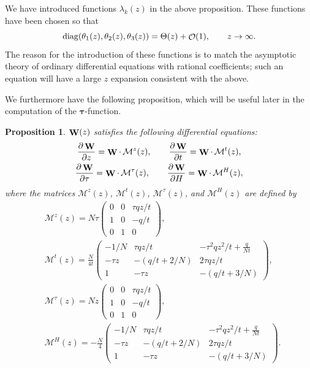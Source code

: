 \documentclass[10pt,a4paper]{amsart}
\DeclareMathOperator{\OO}{\mathcal{O}}
\DeclareMathOperator{\WW}{{\bf W}}
\numberwithin{equation}{section}
\newtheorem{Proposition}[Theorem]{Proposition}
 { \theoremstyle{definition}
\newtheorem{Definition}[Theorem]{Definition}
\newtheorem{Note}[Theorem]{Note}
\newtheorem{Example}[Theorem]{Example}
\newtheorem{Remark}[Theorem]{Remark} }
\begin{document}
\begin{Remark}
 We have introduced functions $\lambda_k(z)$ in the above proposition. These functions have been chosen so that
 \begin{equation*}
 {\rm diag}(\theta_1(z),\theta_2(z),\theta_3(z)) = \Theta(z) + \OO(1), \qquad z\to \infty.
 \end{equation*}
 The reason for the introduction of these functions is to match the asymptotic theory of ordinary differential equations with rational coefficients; such an
 equation will have a large $z$ expansion consistent with the above.
\end{Remark}
We furthermore have the following proposition, which will be useful later in the computation of the $\boldsymbol{\tau}$-function.
\begin{Proposition}
 $\WW(z)$ satisfies the following differential equations:
 \begin{gather}\label{W-differentials}
 \frac{\partial \WW}{\partial z} = \WW\cdot\, \mathcal{M}^{z}(z),\qquad \frac{\partial \WW}{\partial t} = \WW\cdot\, \mathcal{M}^{t}(z), \nonumber\\
 \frac{\partial \WW}{\partial \tau} = \WW\cdot\, \mathcal{M}^{\tau}(z), \qquad \frac{\partial \WW}{\partial H} = \WW\cdot\, \mathcal{M}^{H}(z),
 \end{gather}
 where the matrices $\mathcal{M}^{z}(z)$, $\mathcal{M}^{t}(z)$, $\mathcal{M}^{\tau}(z)$, and $\mathcal{M}^{H}(z)$ are defined by
 \begin{align*}
 &\mathcal{M}^{z}(z)=
 N\tau
 \begin{pmatrix}
 0 & 0 & \tau q z/t\\
 1 & 0 & -q/t\\
 0 & 1 & 0
 \end{pmatrix},\\
 &\mathcal{M}^{t}(z)=
 \frac{N}{4t}
 \begin{pmatrix}
 -1/N & \tau q z/t & -\tau^2 q z^2/t + \frac{q}{Nt}\\
 -\tau z & -(q/t+2/N) & 2\tau q z/t\\
 1 & -\tau z & -(q/t + 3/N)
 \end{pmatrix},\\
 &\mathcal{M}^{\tau}(z)=
 Nz\begin{pmatrix}
 0 & 0 & \tau q z/t\\
 1 & 0 & -q/t\\
 0 & 1 & 0
 \end{pmatrix},\\
 &\mathcal{M}^{H}(z)=
 -\frac{N}{4}
 \begin{pmatrix}
 -1/N & \tau qz/t & -\tau^2 q z^2/t + \frac{q}{Nt}\\
 -\tau z & -(q/t+2/N) & 2\tau q z/t\\
 1 & -\tau z & -(q/t + 3/N)
 \end{pmatrix}.
 \end{align*}
\end{Proposition}
\end{document}
